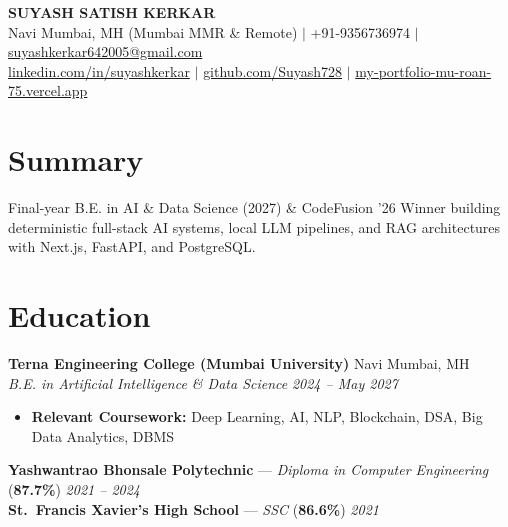 \documentclass[a4paper,11pt]{article}
\newcommand{\resumeItemListStart}{\begin{itemize}[leftmargin=0.14in,label=\textbullet,topsep=2pt plus 1pt,itemsep=2pt plus 1pt,parsep=0pt]}
\newcommand{\resumeItemListEnd}{\end{itemize}}
\begin{document}
\begin{center}
  {\LARGE\bfseries\color{navy} SUYASH SATISH KERKAR} \\ \vspace{2.5pt}
  \small Navi Mumbai, MH (Mumbai MMR \& Remote) \hspace{4pt}$|$\hspace{4pt} +91-9356736974 \hspace{4pt}$|$\hspace{4pt} \href{mailto:suyashkerkar642005@gmail.com}{suyashkerkar642005@gmail.com} \\ \vspace{1.5pt}
  \small \href{https://linkedin.com/in/suyashkerkar}{\color{navy}linkedin.com/in/suyashkerkar} \hspace{4pt}$|$\hspace{4pt} \href{https://github.com/Suyash728}{\color{navy}github.com/Suyash728} \hspace{4pt}$|$\hspace{4pt} \href{https://my-portfolio-mu-roan-75.vercel.app}{\color{navy}my-portfolio-mu-roan-75.vercel.app}
\end{center}

\section{Summary}
Final-year B.E. in AI \& Data Science (2027) \& CodeFusion '26 Winner building deterministic full-stack AI systems, local LLM pipelines, and RAG architectures with Next.js, FastAPI, and PostgreSQL.

\section{Education}
\noindent\textbf{Terna Engineering College (Mumbai University)} \hfill Navi Mumbai, MH \\
\textit{B.E. in Artificial Intelligence \& Data Science} \hfill \textit{2024 -- May 2027}
\resumeItemListStart
  \item \textbf{Relevant Coursework:} Deep Learning, AI, NLP, Blockchain, DSA, Big Data Analytics, DBMS
\resumeItemListEnd
\vspace{3.5pt plus 1.5pt minus 1pt}
\noindent\textbf{Yashwantrao Bhonsale Polytechnic} --- \textit{Diploma in Computer Engineering} (\textbf{87.7\%}) \hfill \textit{2021 -- 2024} \\ \vspace{3.5pt plus 1.5pt minus 1pt}
\noindent\textbf{St.\ Francis Xavier's High School} --- \textit{SSC} (\textbf{86.6\%}) \hfill \textit{2021}
\end{document}
